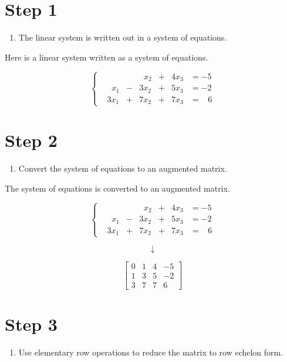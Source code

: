 \documentclass[
  letterpaper,
  DIV=11,
  numbers=noendperiod]{scrreprt}
\providecommand{\tightlist}{%
  \setlength{\itemsep}{0pt}\setlength{\parskip}{0pt}}\usepackage{longtable,booktabs,array}
\begin{document}
\chapter{Step 1}

\begin{enumerate}
\def\labelenumi{\arabic{enumi}.}
\tightlist
\item
  The linear system is written out in a system of equations.
\end{enumerate}

Here is a linear system written as a system of equations.

\[
\begin{cases}
& & &\;\;x_2 &+ &4x_3 &= -5 \\
&\;\;x_1 &- &3x_2 &+ &5x_3 &= -2 \\
&3x_1 &+ &7x_2 &+ &7x_3 &= \;\;\;6
\end{cases}
\]

\chapter{Step 2}

\begin{enumerate}
\def\labelenumi{\arabic{enumi}.}
\setcounter{enumi}{1}
\tightlist
\item
  Convert the system of equations to an augmented matrix.
\end{enumerate}

The system of equations is converted to an augmented matrix.

\[
\begin{cases}
& & &\;\;x_2 &+ &4x_3 &= -5 \\
&\;\;x_1 &- &3x_2 &+ &5x_3 &= -2 \\
&3x_1 &+ &7x_2 &+ &7x_3 &= \;\;\;6
\end{cases}
\]

\[
\downarrow
\]

\[
\left[\begin{array}{ccc|c}
0 & 1 & 4 & -5 \\
1 & 3 & 5 & -2 \\
3 & 7 & 7 & 6
\end{array}\right]
\]

\chapter{Step 3}

\begin{enumerate}
\def\labelenumi{\arabic{enumi}.}
\setcounter{enumi}{2}
\tightlist
\item
  Use elementary row operations to reduce the matrix to row echelon
  form.
\end{enumerate}
\end{document}
